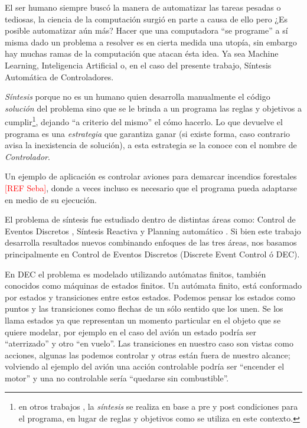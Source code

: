 
El ser humano siempre buscó la manera de automatizar las tareas pesadas o tediosas, la ciencia de la computación surgió en parte a causa de ello pero ¿Es posible automatizar aún más? 
Hacer que una computadora ``se programe'' a sí misma dado un problema a resolver es en cierta medida una utopía, sin embargo hay muchas ramas de la computación que atacan ésta idea. Ya sea Machine Learning, Inteligencia Artificial o, en el caso del presente trabajo, Síntesis Automática de Controladores.

\textit{Síntesis} porque no es un humano quien desarrolla manualmente el código \textit{solución} del problema sino que se le brinda a un programa las reglas y objetivos a cumplir\footnote{en otros trabajos \cite{}, la \textit{síntesis} se realiza en base a pre y post condiciones para el programa, en lugar de reglas y objetivos como se utiliza en este contexto.}, dejando ``a criterio del mismo'' el cómo hacerlo. Lo que devuelve el programa es una \textit{estrategia} que garantiza ganar (si existe forma, caso contrario avisa la inexistencia de solución), a esta estrategia se la conoce con el nombre de \textit{Controlador}.

Un ejemplo de aplicación es controlar aviones para demarcar incendios forestales \textcolor{red}{[REF Seba]}, donde a veces incluso es necesario que el programa pueda adaptarse en medio de su ejecución. %

El problema de síntesis fue estudiado dentro de distintas áreas como: Control de Eventos Discretos \cite{Ramadge:1987:SC}, Síntesis Reactiva \cite{Pnueli:1989:RS} y Planning automático \cite{Nau:2004:AP}. %
Si bien este trabajo desarrolla resultados nuevos combinando enfoques de las tres áreas, nos basamos principalmente en Control de Eventos Discretos (Discrete Event Control ó DEC).

 En DEC el problema es modelado utilizando autómatas finitos, también conocidos como máquinas de estados finitos. 
Un autómata finito, está conformado por estados y transiciones entre estos estados. Podemos pensar los estados como puntos y las transiciones como flechas de un sólo sentido que los unen. Se los llama estados ya que representan un momento particular en el objeto que se quiere modelar, por ejemplo en el caso del avión un estado podría ser ``aterrizado'' y otro ``en vuelo''. Las transiciones en nuestro caso son vistas como acciones, algunas las podemos controlar y otras están fuera de nuestro alcance; volviendo al ejemplo del avión una acción controlable podría ser ``encender el motor'' y una no controlable sería ``quedarse sin combustible''.

